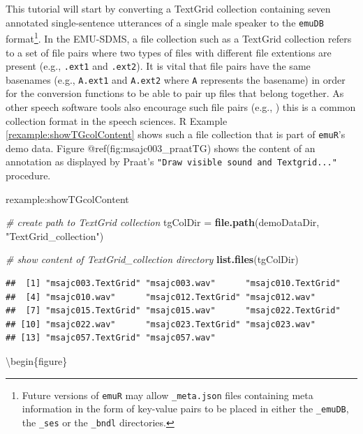 \documentclass[]{book}
\newenvironment{Shaded}{\begin{snugshade}}{\end{snugshade}}
\newcommand{\CommentTok}[1]{\textcolor[rgb]{0.56,0.35,0.01}{\textit{#1}}}
\newcommand{\KeywordTok}[1]{\textcolor[rgb]{0.13,0.29,0.53}{\textbf{#1}}}
\newcommand{\NormalTok}[1]{#1}
\newcommand{\StringTok}[1]{\textcolor[rgb]{0.31,0.60,0.02}{#1}}
\let\rmarkdownfootnote\footnote%
\def\footnote{\protect\rmarkdownfootnote}
\theoremstyle{definition}
\theoremstyle{definition}
\theoremstyle{definition}
\theoremstyle{remark}
\begin{document}
This tutorial will start by converting a TextGrid collection containing
seven annotated single-sentence utterances of a single male speaker to
the \texttt{emuDB} format\footnote{Future versions of \texttt{emuR} may
  allow \texttt{\_meta.json} files containing meta information in the
  form of key-value pairs to be placed in either the \texttt{\_emuDB},
  the \texttt{\_ses} or the \texttt{\_bndl} directories.}. In the
EMU-SDMS, a file collection such as a TextGrid collection refers to a
set of file pairs where two types of files with different file
extentions are present (e.g., \texttt{.ext1} and \texttt{.ext2}). It is
vital that file pairs have the same basenames (e.g., \texttt{A.ext1} and
\texttt{A.ext2} where \texttt{A} represents the basename) in order for
the conversion functions to be able to pair up files that belong
together. As other speech software tools also encourage such file pairs
(e.g., \citet{kisler:2015a}) this is a common collection format in the
speech sciences. R Example \ref{rexample:showTGcolContent} shows such a
file collection that is part of \texttt{emuR}'s demo data. Figure
@ref(fig:msajc003\_praatTG) shows the content of an annotation as
displayed by Praat's \texttt{"Draw\ visible\ sound\ and\ Textgrid..."}
procedure.

rexample:showTGcolContent

\begin{Shaded}
\begin{Highlighting}[]
\CommentTok{# create path to TextGrid collection}
\NormalTok{tgColDir =}\StringTok{ }\KeywordTok{file.path}\NormalTok{(demoDataDir, }\StringTok{"TextGrid_collection"}\NormalTok{)}

\CommentTok{# show content of TextGrid_collection directory}
\KeywordTok{list.files}\NormalTok{(tgColDir)}
\end{Highlighting}
\end{Shaded}

\begin{verbatim}
##  [1] "msajc003.TextGrid" "msajc003.wav"      "msajc010.TextGrid"
##  [4] "msajc010.wav"      "msajc012.TextGrid" "msajc012.wav"     
##  [7] "msajc015.TextGrid" "msajc015.wav"      "msajc022.TextGrid"
## [10] "msajc022.wav"      "msajc023.TextGrid" "msajc023.wav"     
## [13] "msajc057.TextGrid" "msajc057.wav"
\end{verbatim}

\textbackslash{}begin\{figure\}
\end{document}
